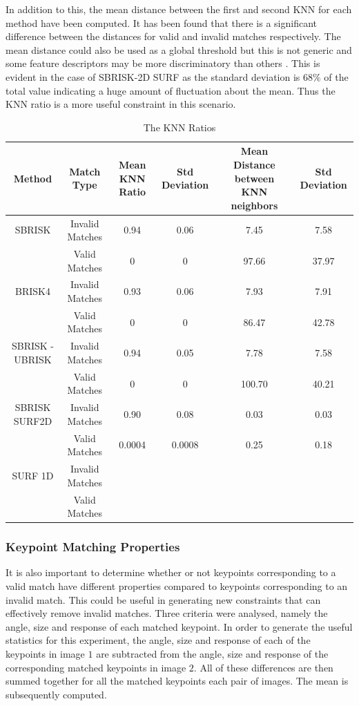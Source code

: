 \documentclass{article}
\begin{document}
In addition to this, the mean distance between the first and second KNN for each method have been computed. It has been found that there is a significant difference between the distances for valid and invalid matches respectively. The mean distance could also be used as a global threshold but this is not generic and some feature descriptors may be more discriminatory than others \cite{Lowe2004}. This is evident in the case of SBRISK-2D SURF as the standard deviation is $68\%$ of the total value indicating a huge amount of fluctuation about the mean. Thus the KNN ratio is a more useful constraint in this scenario.\\

\begin{table}
\caption{The KNN Ratios}
\begin{tabular}{|c|c|c|c|c|c|}
\hline 
Method & Match Type & Mean KNN Ratio & Std Deviation & Mean Distance between KNN neighbors & Std Deviation\tabularnewline
\hline 
\hline 
SBRISK & Invalid Matches & 0.94 & 0.06 & 7.45 & 7.58\tabularnewline
\hline 
 & Valid Matches & 0 & 0 & 97.66 & 37.97\tabularnewline
\hline 
BRISK4 & Invalid Matches & 0.93 & 0.06 & 7.93 & 7.91\tabularnewline
\hline 
 & Valid Matches & 0 & 0 & 86.47 & 42.78\tabularnewline
\hline 
SBRISK - UBRISK & Invalid Matches & 0.94 & 0.05 & 7.78 & 7.58\tabularnewline
\hline 
 & Valid Matches & 0 & 0 & 100.70 & 40.21\tabularnewline
\hline 
SBRISK SURF2D & Invalid Matches & 0.90 & 0.08 & 0.03 & 0.03\tabularnewline
\hline 
 & Valid Matches & 0.0004 & 0.0008 & 0.25 & 0.18\tabularnewline
\hline 
SURF 1D & Invalid Matches &  &  &  & \tabularnewline
\hline 
 & Valid Matches &  &  &  & \tabularnewline
\hline 
\end{tabular}
\label{tab:knnCriterion}
\end{table}


\subsubsection{Keypoint Matching Properties}
\label{sec:keypointMatching}
It is also important to determine whether or not keypoints corresponding to a valid match have different properties compared to keypoints corresponding to an invalid match. This could be useful in generating new constraints that can effectively remove invalid matches. Three criteria were analysed, namely the angle, size and response of each matched keypoint. In order to generate the useful statistics for this experiment, the angle, size and response of each of the keypoints in image $1$ are subtracted from the angle, size and response of the corresponding matched keypoints in image $2$. All of these differences are then summed together for all the matched keypoints each pair of images. The mean is subsequently computed. \\
\end{document}
